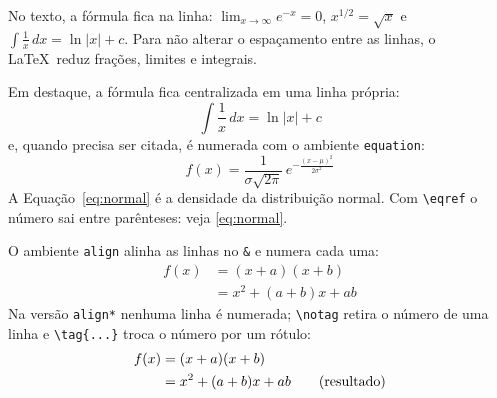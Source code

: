 \documentclass[a4paper]{article}
\begin{document}
No texto, a fórmula fica na linha: $\lim_{x \to \infty} e^{-x} = 0$,
\(x^{1/2} = \sqrt{x}\) e $\int \frac{1}{x}\,dx = \ln\lvert x\rvert + c$. Para
não alterar o espaçamento entre as linhas, o \LaTeX\ reduz frações, limites e
integrais.

\clearpage

Em destaque, a fórmula fica centralizada em uma linha própria:
\[
  \int \frac{1}{x}\,dx = \ln\lvert x\rvert + c
\]
e, quando precisa ser citada, é numerada com o ambiente \texttt{equation}:
\begin{equation}\label{eq:normal}
  f(x) = \frac{1}{\sigma\sqrt{2\pi}}\, e^{-\frac{(x-\mu)^2}{2\sigma^2}}
\end{equation}
A Equação~\ref{eq:normal} é a densidade da distribuição normal. Com
\verb|\eqref| o número sai entre parênteses: veja \eqref{eq:normal}.

\clearpage

O ambiente \texttt{align} alinha as linhas no \verb|&| e numera cada uma:
\begin{align}
  f(x) &= (x+a)(x+b) \\
       &= x^2 + (a+b)x + ab
\end{align}
Na versão \texttt{align*} nenhuma linha é numerada; \verb|\notag| retira o
número de uma linha e \verb|\tag{...}| troca o número por um rótulo:
\begin{align}
  f(x) &= (x+a)(x+b) \notag \\
       &= x^2 + (a+b)x + ab \tag{resultado}
\end{align}
\end{document}
